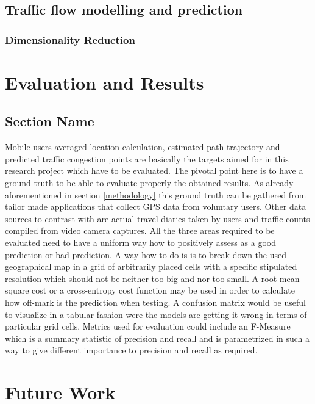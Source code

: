 \documentclass[12pt, a4paper]{report}
\theoremstyle{definition}
\theoremstyle{definition}%
\theoremstyle{definition}%
\theoremstyle{definition}%
\theoremstyle{definition}%
\theoremstyle{definition}%
\begin{document}
\section{Traffic flow modelling and prediction}

\subsection{Dimensionality Reduction}














\chapter{Evaluation and Results}
\section{Section Name}
Mobile users averaged location calculation, estimated path trajectory and predicted traffic congestion points are basically the targets aimed for in this research project which have to be evaluated. The pivotal point here is to have a ground truth to be able to evaluate properly the obtained results. As already aforementioned in section \ref{methodology} this ground truth can be gathered from tailor made applications that collect GPS data from voluntary users. Other data sources to contrast with are actual travel diaries taken by users and traffic counts compiled from video camera captures.
All the three areas required to be evaluated need to have a uniform way how to positively assess as a good prediction or bad prediction. A way how to do is is to break down the used geographical map in a grid of arbitrarily placed cells with a specific stipulated resolution which should not be neither too big and nor too small. A root mean square cost or a cross-entropy cost function may be used in order to calculate how off-mark is the prediction when testing. A confusion matrix would be useful to visualize in a tabular fashion were the models are getting it wrong in terms of particular grid cells. Metrics used for evaluation could include an F-Measure which is a summary statistic of precision and recall and is parametrized in such a way to give different importance to precision and recall as required.

\chapter{Future Work}
\end{document}
